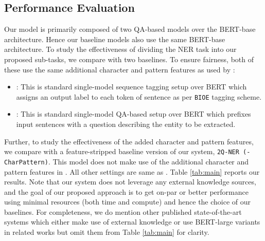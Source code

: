 \subsection{Performance Evaluation}

Our \modelname{} model is primarily composed of two QA-based models over the BERT-base architecture. Hence our baseline models also use the same BERT-base architecture. To study the effectiveness of dividing the NER task into our proposed sub-tasks, we compare \modelname{} with two baselines. To ensure fairness, both of these use the same additional character and pattern features as used by \modelname{}:

\begin{itemize}
    \item \bertseq{}: This is standard single-model sequence tagging setup over BERT which assigns an output label to each token of sentence as per \texttt{BIOE} tagging scheme. 
    
    \item \bertqa{}: This is standard single-model QA-based setup over BERT which prefixes input sentences with a question describing the entity to be extracted. 
\end{itemize}

Further, to study the effectiveness of the added character and pattern features, we compare \modelname{} with a feature-stripped baseline version of our system, \texttt{2Q-NER (-CharPattern)}. This model does not make use of the additional character and pattern features in \spandetect{}. All other settings are same as \modelname{}.
Table \ref{tab:main} reports our results. Note that our system does not leverage any external knowledge sources, and the goal of our proposed approach is to get on-par or better performance using minimal resources (both time and compute) and hence the choice of our baselines. For completeness, we do mention other published state-of-the-art systems which either make use of external knowledge or use BERT-large variants in related works but omit them from Table \ref{tab:main} for clarity.

